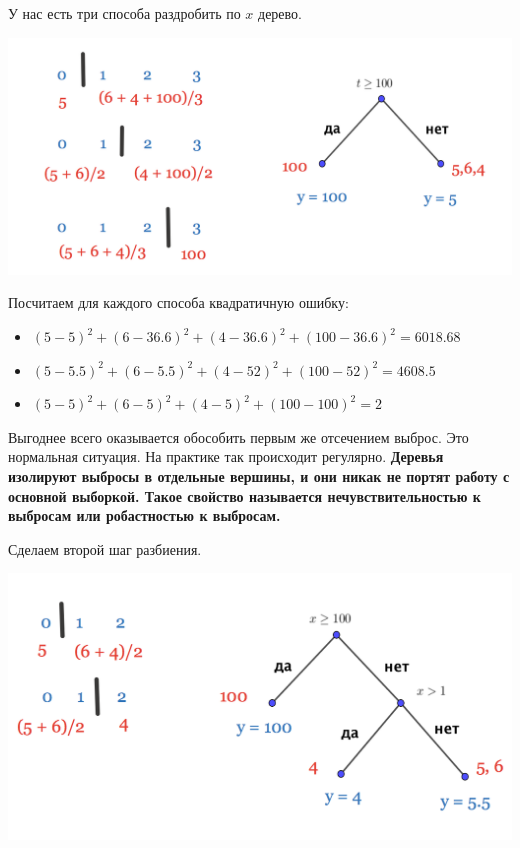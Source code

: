 \documentclass[12pt, a4paper, oneside]{article}
\theoremstyle{plain} %
\theoremstyle{definition}
\newcommand{\indef}[1]{\textbf{ \color{green} #1}}
\begin{document}
\begin{solution}
У нас есть три способа раздробить по $x$ дерево. 

\begin{center}
	\includegraphics[scale=0.25]{reg_tree_3.png}
\end{center}

Посчитаем для каждого способа квадратичную ошибку: 

\begin{itemize}
	\item  $ (5 - 5)^2 + (6 - 36.6)^2 + (4 - 36.6)^2 + (100 - 36.6)^2 = 6018.68$
	\item  $ (5 - 5.5)^2 + (6 - 5.5)^2 + (4 - 52)^2 + (100 - 52)^2 = 4608.5$
	\item  $ (5 - 5)^2 + (6 - 5)^2 + (4 - 5)^2 + (100 - 100)^2 = 2$
\end{itemize}

Выгоднее всего оказывается обособить первым же отсечением выброс. Это нормальная ситуация. На практике так происходит регулярно. \indef{Деревья изолируют выбросы в отдельные вершины, и они никак не портят работу с основной выборкой. Такое свойство называется нечувствительностью к выбросам или робастностью к выбросам.} 

Сделаем второй шаг разбиения. 

\begin{center}
	\includegraphics[scale=0.25]{reg_tree_4.png}
\end{center}


\end{solution}
\end{document}
